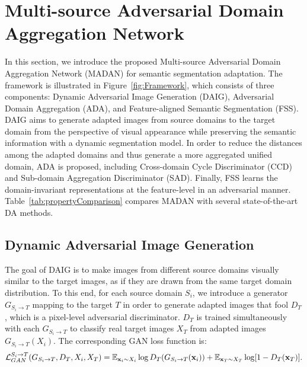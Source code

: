 \documentclass{article}
\begin{document}
\section{Multi-source Adversarial Domain Aggregation Network}
In this section, we introduce the proposed Multi-source Adversarial Domain Aggregation Network (MADAN) for semantic segmentation adaptation. The framework is illustrated in Figure~\ref{fig:Framework}, which consists of three components: Dynamic Adversarial Image Generation (DAIG), Adversarial Domain Aggregation (ADA), and Feature-aligned Semantic Segmentation (FSS). DAIG aims to generate adapted images from source domains to the target domain from the perspective of visual appearance while preserving the semantic information with a dynamic segmentation model. In order to reduce the distances among the adapted domains and thus generate a more aggregated unified domain, ADA is proposed, including Cross-domain Cycle Discriminator (CCD) and Sub-domain Aggregation Discriminator (SAD). Finally, FSS learns the domain-invariant representations at the feature-level in an adversarial manner. Table~\ref{tab:propertyComparison} compares MADAN with several state-of-the-art DA methods.


\subsection{Dynamic Adversarial Image Generation}
The goal of DAIG is to make images from different source domains visually similar to the target images, as if they are drawn from the same target domain distribution. To this end, for each source domain $S_i$, we introduce a generator $G_{S_i\rightarrow T}$ mapping to the target $T$ in order to generate adapted images that fool $D_T$, which is a pixel-level adversarial discriminator. $D_T$ is trained simultaneously with each $G_{S_i\rightarrow T}$ to classify real target images $X_T$ from adapted images $G_{S_i\rightarrow T}(X_i)$. The corresponding GAN loss function is:
\begin{equation}
\mathcal{L}_{GAN}^{S_i\rightarrow T}(G_{S_{i}\rightarrow T},D_T, X_i, X_T)=\mathbb{E}_{\mathbf{x}_{i}\sim X_i}\log D_T(G_{S_{i}\rightarrow T}(\mathbf{x}_{i}))+\mathbb{E}_{\mathbf{x}_T\sim X_T}\log [1-D_T(\mathbf{x}_T)].\\
\label{equ:ganSourceSiT}
\end{equation}
\end{document}
